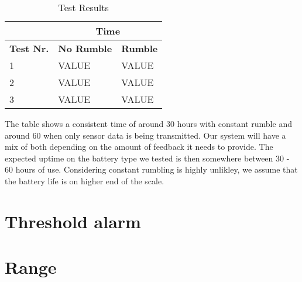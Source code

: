 \begin{table}[h]
\centering
\setlength{\extrarowheight}{0,2cm}
\begin{tabular}{p{2cm}|p{4.75cm}|p{4.75cm}|}
\cline{2-3}
&\multicolumn{2}{c|}{\textbf{Time}}\\ \hline
\textbf{Test Nr.} &\textbf{No Rumble} & \textbf{Rumble} \\ \hline
1 & VALUE & VALUE \\ \hline
2 & VALUE & VALUE \\ \hline
3 & VALUE & VALUE \\ \hline
\end{tabular}
\caption{Test Results}
\label{cake}
\end{table}

The table shows a consistent time of around 30 hours with constant rumble and around 60 when only sensor data is being transmitted. Our system will have a mix of both depending on the amount of feedback it needs to provide. The expected uptime on the battery type we tested is then somewhere between 30 - 60 hours of use. Considering constant rumbling is highly unlikley, we assume that the battery life is on higher end of the scale.

\section{Threshold alarm}


\section{Range}
